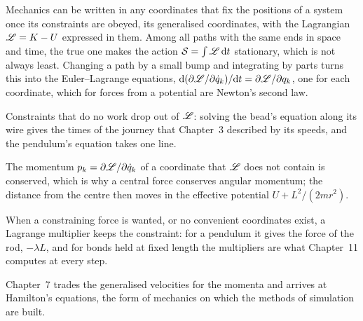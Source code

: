 
Mechanics can be written in any coordinates that fix the positions of a
system once its constraints are obeyed, its generalised coordinates, with
the Lagrangian $\mathscr{L} = K - U$ expressed in them. Among all paths with the
same ends in space and time, the true one makes the action $\mathcal{S} = \int
\mathscr{L}\,\mathrm{d} t$ stationary, which is not always least. Changing a path by a
small bump and integrating by parts turns this into the Euler--Lagrange
equations, $\mathrm{d}(\partial\mathscr{L}/\partial\dot{q}_k)/\mathrm{d} t = \partial\mathscr{L}/
\partial q_k$, one for each coordinate, which for forces from a potential
are Newton's second law.

Constraints that do no work drop out of $\mathscr{L}$:
solving the bead's equation along its wire gives the times of the journey
that Chapter~3 described by its speeds, and the pendulum's equation takes
one line.

The momentum $p_k = \partial\mathscr{L}/\partial\dot{q}_k$ of a
coordinate that $\mathscr{L}$ does not contain is conserved, which is why a
central force conserves angular momentum; the distance from the centre
then moves in the effective potential $U + L^2/(2mr^2)$.

When a
constraining force is wanted, or no convenient coordinates exist, a Lagrange multiplier keeps the constraint: for a pendulum it gives the
force of the rod, $-\lambda L$, and for bonds held at fixed length the
multipliers are what Chapter~11 computes at every step.

Chapter~7 trades the generalised velocities for the momenta and arrives at
Hamilton's equations, the form of mechanics on which the methods of
simulation are built.
